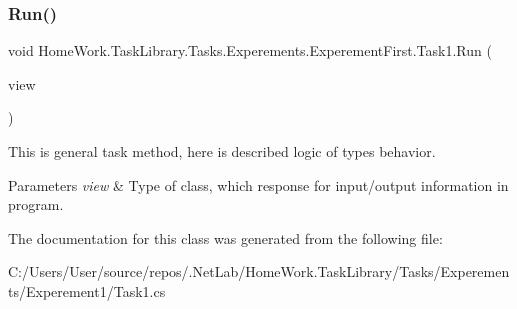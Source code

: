 \subsubsection{\texorpdfstring{Run()}{Run()}}
{\footnotesize\ttfamily void Home\+Work.\+Task\+Library.\+Tasks.\+Experements.\+Experement\+First.\+Task1.\+Run (\begin{DoxyParamCaption}\item[{I\+Information}]{view }\end{DoxyParamCaption})}



This is general task method, here is described logic of types behavior. 


\begin{DoxyParams}{Parameters}
{\em view} & Type of class, which response for input/output information in program.\\
\hline
\end{DoxyParams}


The documentation for this class was generated from the following file\+:\begin{DoxyCompactItemize}
\item 
C\+:/\+Users/\+User/source/repos/.\+Net\+Lab/\+Home\+Work.\+Task\+Library/\+Tasks/\+Experements/\+Experement1/Task1.\+cs\end{DoxyCompactItemize}
